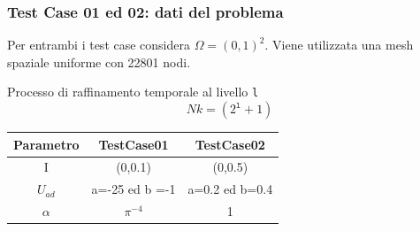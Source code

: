 \documentclass{beamer}
\theoremstyle{definition}
\theoremstyle{remark}
\theoremstyle{plain}
\theoremstyle{definition}
\begin{document}
\begin{frame}
\frametitle{Test Case 01 ed 02: dati del problema}

Per entrambi i test case considera $\Omega = (0,1)^2$.
Viene utilizzata una mesh spaziale uniforme con 22801 nodi.

Processo di raffinamento temporale al livello \texttt{l} 
\begin{equation*}
Nk = ( 2^{\texttt{l} } + 1 )
\label{Nk}
\end{equation*}

\begin{table}
\centering
\begin{tabular}{|c|c|c|}
\hline
\textbf{Parametro} & \textbf{TestCase01} & \textbf{TestCase02} \\
\hline
I & (0,0.1) & (0,0.5) \\
\hline
$U_{ad}$ & a=-25 ed b =-1 & a=0.2 ed b=0.4 \\
\hline
$\alpha$ & $\pi^{-4}$ & 1 \\
\hline
\end{tabular}
\end{table}

\end{frame}
\end{document}
